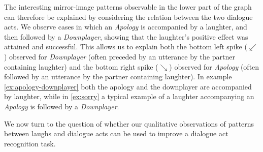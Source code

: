 \documentclass[11pt,a4paper]{article}
\begin{document}
The interesting mirror-image %
patterns
observable in the lower part of the graph can therefore be explained
by considering the relation between the two dialogue acts.  We
observe cases in which an \textit{Apology} is accompanied by a
laughter, and then followed by a \textit{Downplayer}, showing 
that the laughter’s positive effect was attained and successful. This
allows us to explain both the bottom left spike ($\swarrow$) observed for
\textit{Downplayer} (often preceded by an utterance by the
partner containing laughter) and the bottom right spike ($\searrow$) observed
for \emph{Apology} (often followed by an utterance by the
partner containing laughter). In example \ref{ex:apology-downplayer}
both the apology and the downplayer are accompanied by laughter, while
in \ref{ex:sorry} a typical example of a laughter accompanying an \emph{Apology}
is followed by a \emph{Downplayer}.


\begin{lingex}
\item\label{ex:sorry}
  \small
\end{lingex}

We now turn to the question of whether our qualitative observations of patterns between laughs and dialogue acts can be used to improve a dialogue act recognition task.





\end{document}
